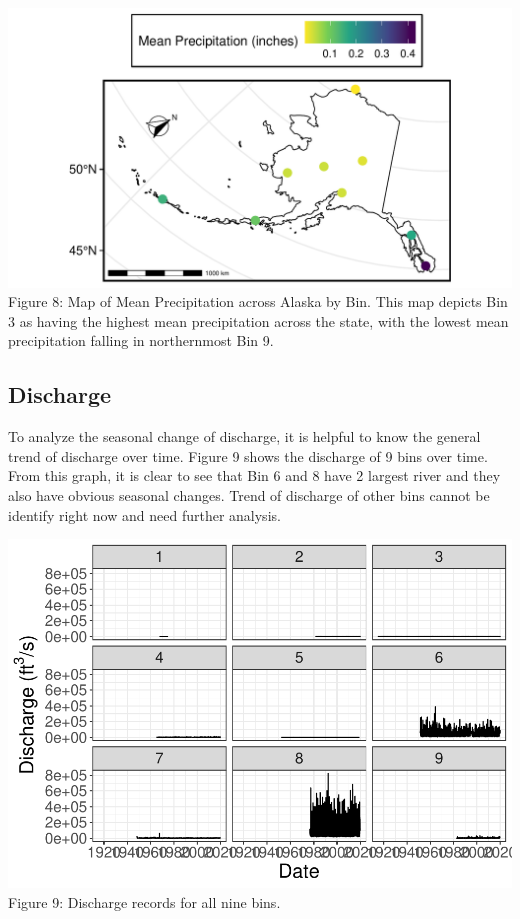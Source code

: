 \documentclass[12pt,]{article}
\begin{document}
\includegraphics{Project_Report_v2_files/figure-latex/unnamed-chunk-5-1.pdf}
Figure 8: Map of Mean Precipitation across Alaska by Bin. This map
depicts Bin 3 as having the highest mean precipitation across the state,
with the lowest mean precipitation falling in northernmost Bin 9.

\newpage

\newpage

\newpage

\hypertarget{discharge-1}{%
\subsection{Discharge}\label{discharge-1}}

To analyze the seasonal change of discharge, it is helpful to know the
general trend of discharge over time. Figure 9 shows the discharge of 9
bins over time. From this graph, it is clear to see that Bin 6 and 8
have 2 largest river and they also have obvious seasonal changes. Trend
of discharge of other bins cannot be identify right now and need further
analysis.

\includegraphics{Project_Report_v2_files/figure-latex/Discharge Exploratory Data Wrangling-1.pdf}
Figure 9: Discharge records for all nine bins.
\end{document}
